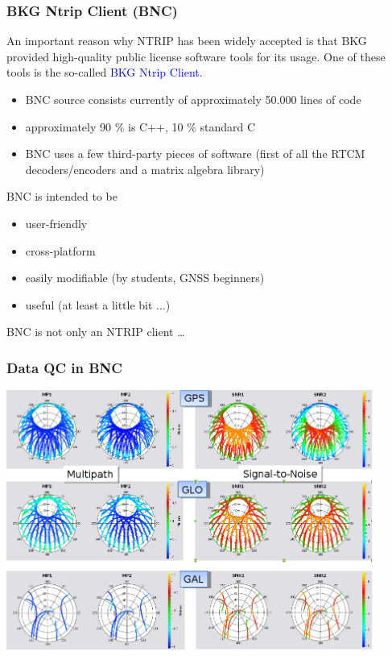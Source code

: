 \documentclass[10pt]{beamer}
\begin{document}

\begin{frame}
\frametitle{BKG Ntrip Client (BNC)}

An important reason why NTRIP has been widely accepted is that BKG provided high-quality public
license software tools for its usage. One of these tools is the so-called \textcolor{blue}{BKG
Ntrip Client}.

  \begin{itemize}
  \item BNC source consists currently of approximately 50.000 lines of code 
  \item approximately 90 \% is C++, 10 \% standard C
  \item BNC uses a few third-party pieces of software (first of all the RTCM
    decoders/encoders and a matrix algebra library)
  \end{itemize}

  \begin{block}{BNC is intended to be}
  \begin{itemize}
  \item user-friendly
  \item cross-platform
  \item easily modifiable (by students, GNSS beginners)
  \item useful (at least a little bit ...)
  \end{itemize}
  \end{block}

  \begin{block}{BNC is not only an NTRIP client \ldots}
  \end{block}

\end{frame}


\begin{frame}
  \frametitle{Data QC in BNC}
  \begin{center}
    \includegraphics[width=0.9\textwidth,angle=0]{bnc_qc1.png}
  \end{center}
\end {frame}
\end{document}
